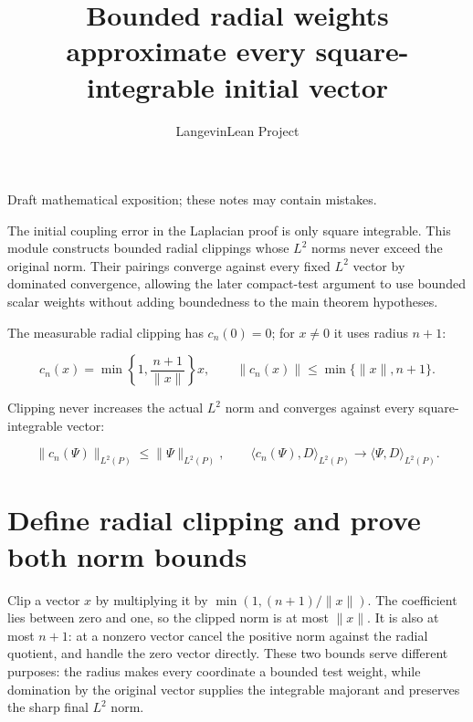 \documentclass[11pt,a4paper]{article}
\title{\texorpdfstring{Bounded radial weights approximate every square-integrable initial vector}{Bounded radial weights approximate every square-integrable initial vector}}
\author{LangevinLean Project}
\date{}
\begin{document}
\maketitle
Draft mathematical exposition; these notes may contain mistakes.


The initial coupling error in the Laplacian proof is only square integrable. This module constructs bounded radial clippings whose \(L^{2}\) norms never exceed the original norm. Their pairings converge against every fixed \(L^{2}\) vector by dominated convergence, allowing the later compact-test argument to use bounded scalar weights without adding boundedness to the main theorem hypotheses.



The measurable radial clipping has \(c_n(0)=0\); for \(x\ne0\) it uses radius \(n+1\):


\[c_n(x)=\min\!\left\{1,\frac{n+1}{\|x\|}\right\}x,
\qquad\|c_n(x)\|\le\min\{\|x\|,n+1\}.\]


Clipping never increases the actual \(L^2\) norm and converges against every square-integrable vector:


\[\|c_n(\Psi)\|_{L^2(P)}\le\|\Psi\|_{L^2(P)},\qquad
\langle c_n(\Psi),D\rangle_{L^2(P)}
\longrightarrow\langle\Psi,D\rangle_{L^2(P)}.\]
\section{\texorpdfstring{Define radial clipping and prove both norm bounds}{Define radial clipping and prove both norm bounds}}


Clip a vector \(x\) by multiplying it by \(\min(1,(n+1)/\|x\|)\). The coefficient lies between zero and one, so the clipped norm is at most \(\|x\|\). It is also at most \(n+1\): at a nonzero vector cancel the positive norm against the radial quotient, and handle the zero vector directly. These two bounds serve different purposes: the radius makes every coordinate a bounded test weight, while domination by the original vector supplies the integrable majorant and preserves the sharp final \(L^{2}\) norm.
\end{document}
